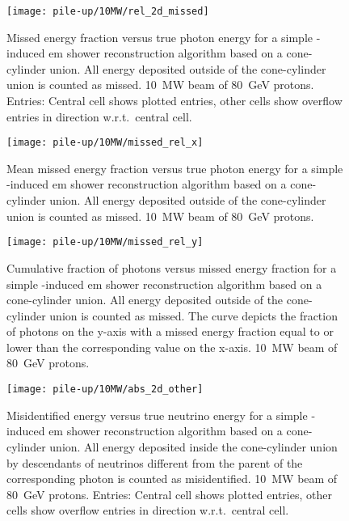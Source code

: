 \begin{figure}[tbp]
	\centering
	\texttt{[image: pile-up/10MW/rel\_2d\_missed]}
	\caption[Pile-up study missed fractional vs.\ true photon energy, \SI{10}{\mega\watt} beam]{%
		Missed energy fraction versus true photon energy for a simple \Pgpz-induced \acrshort{em} shower reconstruction algorithm based on a cone-cylinder union.
		All energy deposited outside of the cone-cylinder union is counted as missed.
		\SI{10}{\mega\watt} beam of \SI{80}{\giga\electronvolt} protons.
		Entries: Central cell shows plotted entries, other cells show overflow entries in direction w.r.t.\ central cell.
	}
\end{figure}

\begin{figure}[tbp]
	\centering
	\texttt{[image: pile-up/10MW/missed\_rel\_x]}
	\caption[Pile-up study mean missed fractional vs.\ true photon energy, \SI{10}{\mega\watt} beam]{%
		Mean missed energy fraction versus true photon energy for a simple \Pgpz-induced \acrshort{em} shower reconstruction algorithm based on a cone-cylinder union.
		All energy deposited outside of the cone-cylinder union is counted as missed.
		\SI{10}{\mega\watt} beam of \SI{80}{\giga\electronvolt} protons.
	}
\end{figure}

\begin{figure}[tbp]
	\centering
	\texttt{[image: pile-up/10MW/missed\_rel\_y]}
	\caption[Pile-up study photon vs.\ missed energy fraction, \SI{10}{\mega\watt} beam]{%
		Cumulative fraction of photons versus missed energy fraction for a simple \Pgpz-induced \acrshort{em} shower reconstruction algorithm based on a cone-cylinder union.
		All energy deposited outside of the cone-cylinder union is counted as missed.
		The curve depicts the fraction of photons on the y-axis with a missed energy fraction equal to or lower than the corresponding value on the x-axis.
		\SI{10}{\mega\watt} beam of \SI{80}{\giga\electronvolt} protons.
	}
\end{figure}

\begin{figure}[tbp]
	\centering
	\texttt{[image: pile-up/10MW/abs\_2d\_other]}
	\caption[Pile-up study misidentified vs.\ true neutrino energy, \SI{10}{\mega\watt} beam]{%
		Misidentified energy versus true neutrino energy for a simple \Pgpz-induced \acrshort{em} shower reconstruction algorithm based on a cone-cylinder union.
		All energy deposited inside the cone-cylinder union by descendants of neutrinos different from the parent of the corresponding \Pgpz photon is counted as misidentified.
		\SI{10}{\mega\watt} beam of \SI{80}{\giga\electronvolt} protons.
		Entries: Central cell shows plotted entries, other cells show overflow entries in direction w.r.t.\ central cell.
	}
\end{figure}

